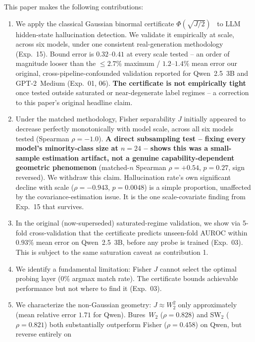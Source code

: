 \documentclass[onecolumn]{jmlr}
\begin{document}
This paper makes the following contributions:
\begin{enumerate}[leftmargin=*, topsep=2pt, itemsep=1pt]
  \item We apply the classical Gaussian binormal certificate
    $\Phi(\sqrt{J/2})$~\citep{green1966signal,bamber1975area,hanley1982meaning}
    to LLM hidden-state hallucination detection. We validate it
    empirically at scale, across six models, under one consistent
    real-generation methodology (Exp.~15). Bound error is $0.32$--$0.41$
    at every scale tested -- an order of magnitude looser than the
    $\leq 2.7\%$ maximum / $1.2$--$1.4\%$ mean error our original,
    cross-pipeline-confounded validation reported for Qwen~2.5~3B and
    GPT-2~Medium (Exp.~01, 06). \textbf{The certificate is not
    empirically tight} once tested outside saturated or near-degenerate
    label regimes -- a correction to this paper's original headline
    claim.
  \item Under the matched methodology, Fisher separability $J$ initially
    appeared to decrease perfectly monotonically with model scale, across
    all six models tested (Spearman $\rho=-1.0$). \textbf{A direct
    subsampling test -- fixing every model's minority-class size at
    $n=24$ -- shows this was a small-sample estimation artifact, not a
    genuine capability-dependent geometric phenomenon} (matched-$n$
    Spearman $\rho=+0.54$, $p=0.27$, sign reversed). We withdraw this
    claim. Hallucination rate's own significant decline with scale
    ($\rho=-0.943$, $p=0.0048$) is a simple proportion, unaffected by the
    covariance-estimation issue. It is the one scale-covariate finding
    from Exp.~15 that survives.
  \item In the original (now-superseded) saturated-regime validation, we
    show via 5-fold cross-validation that the certificate predicts
    unseen-fold AUROC within $0.93\%$ mean error on Qwen~2.5~3B, before
    any probe is trained (Exp.~03). This is subject to the same
    saturation caveat as contribution 1.
  \item We identify a fundamental limitation: Fisher $J$ cannot select the
    optimal probing layer (0\% argmax match rate).  The certificate bounds
    achievable performance but not where to find it (Exp.~03).
  \item We characterize the non-Gaussian geometry: $J \approx W_2^2$ only
    approximately (mean relative error $1.71$ for Qwen). Bures~$W_2$
    ($\rho = 0.828$) and SW$_2$ ($\rho = 0.821$) both substantially
    outperform Fisher ($\rho = 0.458$) on Qwen, but reverse entirely on

\end{enumerate}
\end{document}
